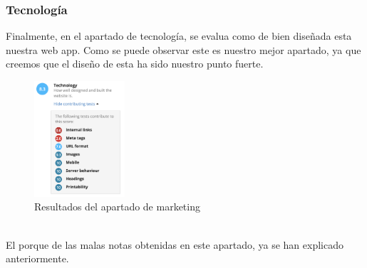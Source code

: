\documentclass{article}
\begin{document}
\subsubsection{Tecnología}
Finalmente, en el apartado de tecnología, se evalua como de bien diseñada esta nuestra web app. Como se puede observar este es nuestro mejor apartado, ya que creemos que el diseño de esta ha sido nuestro punto fuerte.
\begin{figure}[ht]
    \centering
    \includegraphics[width=0.3\textwidth]{images/tecnologia.png}
    \caption{Resultados del apartado de marketing}
\end{figure}\\
El porque de las malas notas obtenidas en este apartado, ya se han explicado anteriormente.
\end{document}
